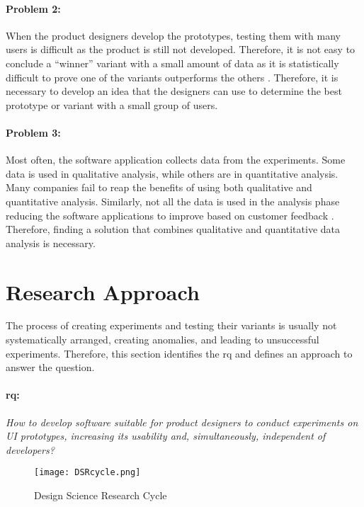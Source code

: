 \paragraph{Problem 2:} When the product designers develop the prototypes, testing them with many users is difficult as the product is still not developed.
Therefore, it is not easy to conclude a ``winner'' variant with a small amount of data as it is statistically difficult to prove one of the variants outperforms the others \cite{article:usability:smalldata}.
Therefore, it is necessary to develop an idea that the designers can use to determine the best prototype or variant with a small group of users.

\paragraph{Problem 3:} Most often, the software application collects data from the experiments. 
Some data is used in qualitative analysis, while others are in quantitative analysis.
Many companies fail to reap the benefits of using both qualitative and quantitative analysis.
Similarly, not all the data is used in the analysis phase reducing the software applications to improve based on customer feedback \cite{article:datadrive:brian}.
Therefore, finding a solution that combines qualitative and quantitative data analysis is necessary.
\clearpage
\section{Research Approach}  %
\label{introduction:section:research}
The process of creating experiments and testing their variants is usually not systematically arranged, creating anomalies, and leading to unsuccessful experiments.
Therefore, this section identifies the \ac{rq} and defines an approach to answer the question.

\paragraph{\ac{rq}:} \textit{How to develop software suitable for product designers to conduct experiments on UI prototypes, increasing its usability and, simultaneously, independent of developers?}\\

\begin{figure}[ht]
    \centering
    \texttt{[image: DSRcycle.png]}
    \caption[Design Science Research Cycle]{Design Science Research Cycle \cite{paper:designprinciple:vk}}
    \label{intro:fig:dps}
\end{figure}

